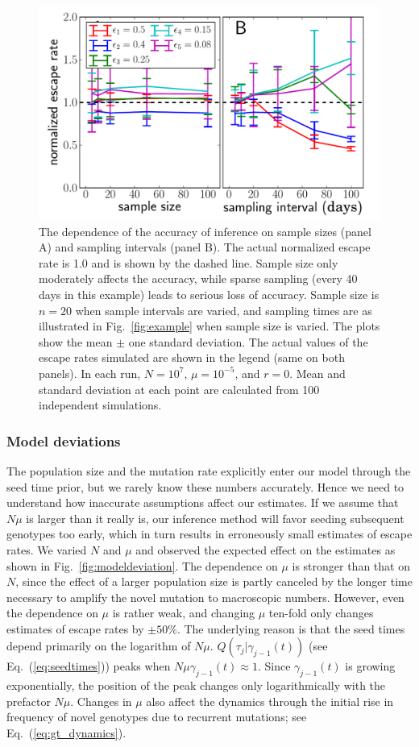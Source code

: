 \documentclass{frontiers}
\newcommand{\EQ}[1]{Eq.~(\ref{eq:#1})}
\newcommand{\FIG}[1]{Fig.~\ref{fig:#1}}
\newcommand{\gtfreq}{\gamma}
\begin{document}
\begin{figure}[htp]
\begin{center}
  \includegraphics[width=0.49\columnwidth,type=pdf,ext=.pdf,read=.pdf]
{figures_manuscript/model_sampling_variation_ML_logN_7_simMu_1e-05_F_10_S_1}
  \caption[labelInTOC]{The dependence of the accuracy of inference on sample sizes (panel A)
  and sampling intervals (panel B). The actual normalized 
  escape rate is 1.0 and is shown by the dashed line. Sample size only moderately 
  affects the
  accuracy, while sparse sampling (every 40 days in this example) leads to
  serious loss of accuracy. Sample size is
  $n=20$ when sample intervals are varied, and sampling times are as
  illustrated in \FIG{example} when sample size is varied. The plots show the
  mean $\pm$ one standard deviation. The actual values of the escape rates simulated
are shown in the legend (same on both panels). In each run,
$N = 10^7$, $\mu = 10^{-5}$, and $r=0$. Mean and standard deviation at
each point are calculated from 100 independent simulations. }
  \label{fig:sample}
\end{center}
\end{figure}


\subsubsection{Model deviations}
The population size and the mutation rate explicitly enter our model through the
seed time prior, but we rarely know these numbers accurately. Hence we
need to understand how inaccurate assumptions affect our estimates.
If we assume that $N\mu$ is larger than it really is, our inference
method will favor seeding subsequent
genotypes too early, which in turn results in erroneously small estimates of escape rates. We varied
$N$ and $\mu$ and observed the expected effect on the estimates as shown in
\FIG{modeldeviation}. The dependence on $\mu$ is stronger than that on $N$, since
the effect of a larger population size is partly canceled by the longer time
necessary to amplify the novel mutation to macroscopic numbers.
However, even the dependence on $\mu$ is rather weak, and
changing $\mu$ ten-fold only changes estimates of escape rates by $\pm 50\%$.
The underlying reason is that the seed times depend primarily on the logarithm
of $N\mu$. $Q(\tau_j|\gtfreq_{j-1}(t))$ (see \EQ{seedtimes}) peaks when $N\mu
\gtfreq_{j-1}(t)\approx 1$. Since $\gtfreq_{j-1}(t)$ is growing
exponentially, the position of the peak changes only logarithmically
with the prefactor $N\mu$. Changes in $\mu$ also affect the dynamics
through the initial rise in frequency of novel genotypes due to recurrent
mutations; see \EQ{gt_dynamics}.
\end{document}
